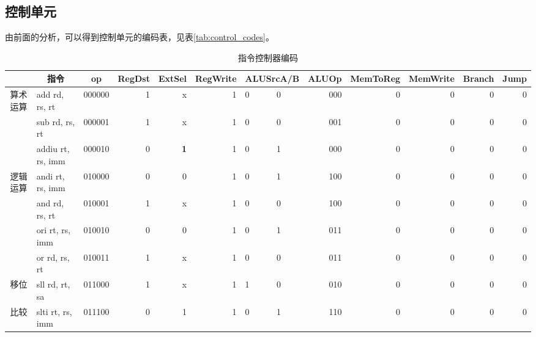 
\subsection{控制单元}
\label{sub:control_unit}
\qquad 由前面的分析，可以得到控制单元的编码表，见表\ref{tab:control_codes}。
\begin{sidewaystable}[htbp]
  \centering\xiaowu
  \caption{指令控制器编码}
    \begin{tabular}{|c|l|l|r|r|r|p{1cm}|p{1cm}|r|r|r|r|r|}
    \hline
          & \multicolumn{1}{c|}{指令} & \multicolumn{1}{c|}{op} & \multicolumn{1}{c|}{RegDst} & \multicolumn{1}{c|}{ExtSel} & \multicolumn{1}{c|}{RegWrite} & \multicolumn{2}{c|}{ALUSrcA/B} & \multicolumn{1}{c|}{ALUOp} & \multicolumn{1}{c|}{MemToReg} & \multicolumn{1}{c|}{MemWrite} & \multicolumn{1}{c|}{Branch} & \multicolumn{1}{c|}{Jump} \bigstrut\\
    \hline
    \multirow{3}[6]{*}{算术运算} & add rd, rs, rt & 000000 & 1     & x     & 1     & 0     & 0     & 000   & 0     & 0     & 0     & 0 \bigstrut\\
\cline{2-13}          & sub rd, rs, rt & 000001 & 1     & x     & 1     & 0     & 0     & 001   & 0     & 0     & 0     & 0 \bigstrut\\
\cline{2-13}          & addiu rt, rs, imm & 000010 & 0     & \textbf{1} & 1     & 0     & 1     & 000   & 0     & 0     & 0     & 0 \bigstrut\\
    \hline
    \multirow{4}[8]{*}{逻辑运算} & andi rt, rs, imm & 010000 & 0     & 0     & 1     & 0     & 1     & 100   & 0     & 0     & 0     & 0 \bigstrut\\
\cline{2-13}          & and rd, rs, rt & 010001 & 1     & x     & 1     & 0     & 0     & 100   & 0     & 0     & 0     & 0 \bigstrut\\
\cline{2-13}          & ori rt, rs, imm & 010010 & 0     & 0     & 1     & 0     & 1     & 011   & 0     & 0     & 0     & 0 \bigstrut\\
\cline{2-13}          & or rd, rs, rt & 010011 & 1     & x     & 1     & 0     & 0     & 011   & 0     & 0     & 0     & 0 \bigstrut\\
    \hline
    移位    & sll rd, rt, sa & 011000 & 1     & x     & 1     & 1     & 0     & 010   & 0     & 0     & 0     & 0 \bigstrut\\
    \hline
    比较    & slti rt, rs, imm & 011100 & 0     & 1     & 1     & 0     & 1     & 110   & 0     & 0     & 0     & 0 \bigstrut\\

\end{tabular}
\end{sidewaystable}
